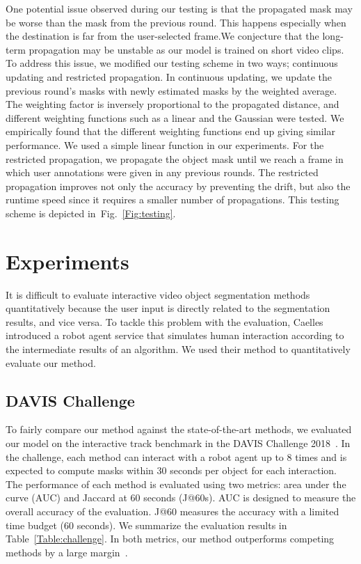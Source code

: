 \documentclass[10pt,twocolumn,letterpaper]{article}
\newcommand{\Tref}[1]{Table~\ref{#1}}
\newcommand{\fref}[1]{Fig.~\ref{#1}}
\begin{document}
One potential issue observed during our testing is that the propagated mask may be worse than the mask from the previous round. This happens especially when the destination is far from the user-selected frame.We conjecture that the long-term propagation may be unstable as our model is trained on short video clips. To address this issue, we modified our testing scheme in two ways; continuous updating and restricted propagation. In continuous updating, we update the previous round's masks with newly estimated masks by the weighted average. The weighting factor is inversely proportional to the propagated distance, and different weighting functions such as a linear and the Gaussian were tested. We empirically found that the different weighting functions end up giving similar performance. We used a simple linear function in our experiments. For the restricted propagation, we propagate the object mask until we reach a frame in which user annotations were given in any previous rounds. The restricted propagation improves not only the accuracy by preventing the drift, but also the runtime speed since it requires a smaller number of propagations. This testing scheme is depicted in~\fref{Fig:testing}. 





\section{Experiments}
It is difficult to evaluate interactive video object segmentation methods quantitatively because the user input is directly related to the segmentation results, and vice versa. 
To tackle this problem with the evaluation, Caelles~\etal\cite{caelles20182018} introduced a robot agent service that simulates human interaction according to the intermediate results of an algorithm. We used their method to quantitatively evaluate our method. 

\subsection{DAVIS Challenge}
To fairly compare our method against the state-of-the-art methods, we evaluated our model on the interactive track benchmark in the DAVIS Challenge 2018~\cite{caelles20182018}. In the challenge, each method can interact with a robot agent up to 8 times and is expected to compute masks within 30 seconds per object for each interaction. The performance of each method is evaluated using two metrics: area under the curve (AUC) and Jaccard at 60 seconds (J@60s). AUC is designed to measure the overall accuracy of the evaluation. J@60 measures the accuracy with a limited time budget (60 seconds). We summarize the evaluation results in \Tref{Table:challenge}. In both metrics, our method outperforms competing methods by a large margin~\cite{DAVIS2018-Interactive-1st}. 
\end{document}

